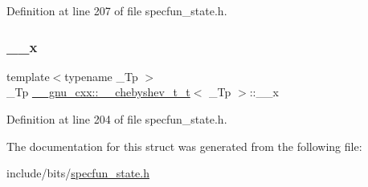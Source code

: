 Definition at line 207 of file specfun\+\_\+state.\+h.

\mbox{\label{struct____gnu__cxx_1_1____chebyshev__t__t_adc03ac0a37e1d895bd74330772146eb7}} 
\subsubsection{\texorpdfstring{\+\_\+\+\_\+x}{\_\_x}}
{\footnotesize\ttfamily template$<$typename \+\_\+\+Tp $>$ \\
\+\_\+\+Tp \hyperlink{struct____gnu__cxx_1_1____chebyshev__t__t}{\+\_\+\+\_\+gnu\+\_\+cxx\+::\+\_\+\+\_\+chebyshev\+\_\+t\+\_\+t}$<$ \+\_\+\+Tp $>$\+::\+\_\+\+\_\+x}



Definition at line 204 of file specfun\+\_\+state.\+h.



The documentation for this struct was generated from the following file\+:\begin{DoxyCompactItemize}
\item 
include/bits/\hyperlink{specfun__state_8h}{specfun\+\_\+state.\+h}\end{DoxyCompactItemize}
